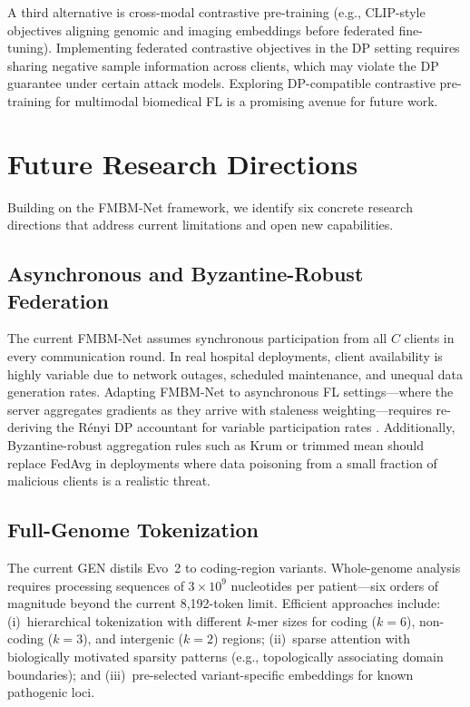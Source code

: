\documentclass[a4paper,fleqn]{cas-dc}
\begin{document}
A third alternative is cross-modal contrastive pre-training (e.g., CLIP-style
objectives aligning genomic and imaging embeddings before federated fine-tuning).
Implementing federated contrastive objectives in the DP setting requires
sharing negative sample information across clients, which may violate the DP
guarantee under certain attack models. Exploring DP-compatible contrastive
pre-training for multimodal biomedical FL is a promising avenue for future work.

\section{Future Research Directions}
\label{sec:future}

Building on the FMBM-Net framework, we identify six concrete research directions
that address current limitations and open new capabilities.

\subsection{Asynchronous and Byzantine-Robust Federation}

The current FMBM-Net assumes synchronous participation from all $C$ clients
in every communication round. In real hospital deployments, client availability
is highly variable due to network outages, scheduled maintenance, and unequal
data generation rates. Adapting FMBM-Net to asynchronous FL settings---where
the server aggregates gradients as they arrive with staleness weighting---requires
re-deriving the R\'{e}nyi DP accountant for variable participation rates
\citep{mironov2017renyi}. Additionally, Byzantine-robust aggregation rules
such as Krum or trimmed mean should replace FedAvg in deployments where
data poisoning from a small fraction of malicious clients is a realistic threat.

\subsection{Full-Genome Tokenization}

The current GEN distils Evo~2 \citep{evo2_2026} to coding-region variants.
Whole-genome analysis requires processing sequences of $3\!\times\!10^9$
nucleotides per patient---six orders of magnitude beyond the current 8,192-token
limit. Efficient approaches include: (i)~hierarchical tokenization with
different $k$-mer sizes for coding ($k\!=\!6$), non-coding ($k\!=\!3$), and
intergenic ($k\!=\!2$) regions; (ii)~sparse attention with biologically
motivated sparsity patterns (e.g., topologically associating domain boundaries);
and (iii)~pre-selected variant-specific embeddings for known pathogenic loci.
\end{document}
